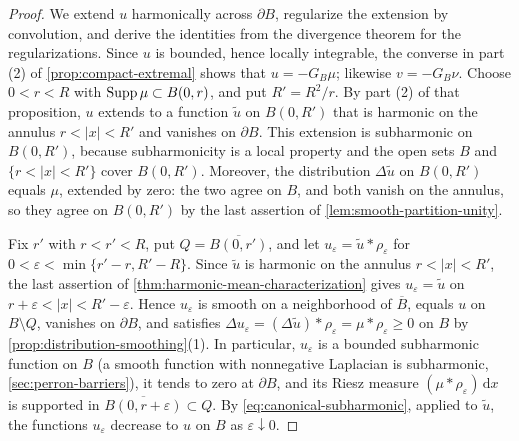 \begin{proof}
We extend $u$ harmonically across $\partial B$, regularize the extension by convolution, and derive the identities from the divergence theorem for the regularizations. Since $u$ is bounded, hence locally integrable, the converse in part (2) of \cref{prop:compact-extremal} shows that $u=-G_B\mu$; likewise $v=-G_B\nu$. Choose $0<r<R$ with $\operatorname{Supp}\mu\subset B(0,r)$, and put $R'=R^2/r$. By part (2) of that proposition, $u$ extends to a function $\widetilde u$ on $B(0,R')$ that is harmonic on the annulus $r<|x|<R'$ and vanishes on $\partial B$. This extension is subharmonic on $B(0,R')$, because subharmonicity is a local property and the open sets $B$ and $\{r<|x|<R'\}$ cover $B(0,R')$. Moreover, the distribution $\Delta\widetilde u$ on $B(0,R')$ equals $\mu$, extended by zero: the two agree on $B$, and both vanish on the annulus, so they agree on $B(0,R')$ by the last assertion of \cref{lem:smooth-partition-unity}.

Fix $r'$ with $r<r'<R$, put $Q=\overline{B(0,r')}$, and let $u_\varepsilon=\widetilde u*\rho_\varepsilon$ for $0<\varepsilon<\min\{r'-r,R'-R\}$. Since $\widetilde u$ is harmonic on the annulus $r<|x|<R'$, the last assertion of \cref{thm:harmonic-mean-characterization} gives $u_\varepsilon=\widetilde u$ on $r+\varepsilon<|x|<R'-\varepsilon$. Hence $u_\varepsilon$ is smooth on a neighborhood of $\overline B$, equals $u$ on $B\setminus Q$, vanishes on $\partial B$, and satisfies $\Delta u_\varepsilon=(\Delta\widetilde u)*\rho_\varepsilon=\mu*\rho_\varepsilon\geq0$ on $B$ by \cref{prop:distribution-smoothing}(1). In particular, $u_\varepsilon$ is a bounded subharmonic function on $B$ (a smooth function with nonnegative Laplacian is subharmonic, \cref{sec:perron-barriers}), it tends to zero at $\partial B$, and its Riesz measure $(\mu*\rho_\varepsilon)\,\mathrm dx$ is supported in $\overline{B(0,r+\varepsilon)}\subset Q$. By \eqref{eq:canonical-subharmonic}, applied to $\widetilde u$, the functions $u_\varepsilon$ decrease to $u$ on $B$ as $\varepsilon\downarrow0$.


\end{proof}
